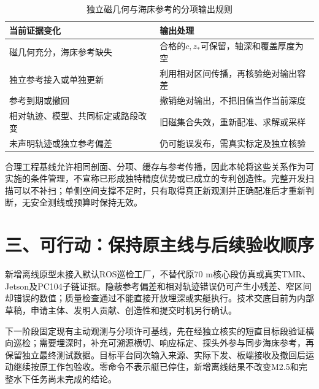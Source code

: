 \begin{table}[htbp]
\centering
\caption{独立磁几何与海床参考的分项输出规则}\label{tab:middle-round2-dependency}
\begin{tabularx}{\linewidth}{@{}p{4.3cm}X@{}}
\toprule
当前证据变化 & 输出处理\\
\midrule
磁几何充分，海床参考缺失 & 合格的$c,z_*$可保留，轴深和覆盖厚度为空\\
独立参考接入或单独更新 & 利用相对区间传播，再核验绝对输出容差\\
参考到期或撤回 & 撤销绝对输出，不把旧值当作当前深度\\
相对轨迹、模型、共同标定或路段改变 & 旧磁集合失效，重新配准、求解或采样\\
未声明轨迹或独立参考偏差 & 仍可能误发布，需真实标定及独立核验\\
\bottomrule
\end{tabularx}
\end{table}

合理工程基线允许相同剖面、分项、缓存与参考传播，因此本轮将这些关系作为可实施的条件管理，不宣称已形成独特精度优势或已成立的专利创造性。完整开发扫描可以不补扫；单侧空间支撑不足时，只有取得真正新观测并正确配准后才重新判断，无安全测线或预算时保持无效。

\section*{三、可行动：保持原主线与后续验收顺序}

新增离线原型未接入默认ROS巡检工厂，不替代原70 m核心段仿真或真实TMR、Jetson及PC104子链证据。隐蔽参考偏差和相对轨迹错误仍可产生小残差、窄区间却错误的数值；质量检查通过不能直接开放埋深或实艇执行。技术交底目前为内部草稿，申请主体、发明人贡献、创造性和提交时机另行确认。

下一阶段固定现有主动观测与分项许可基线，先在经独立核实的短直目标段验证横向巡检；需要埋深时，补充可溯源横切、响应标定、探头外参与同步海床参考，再保留独立最终测试数据。目标平台同次输入来源、实际下发、板端接收及撤回后运动继续按原工作包验收。零命令不表示艇已停住，新增离线结果不改变M2.5和完整水下任务尚未完成的结论。
